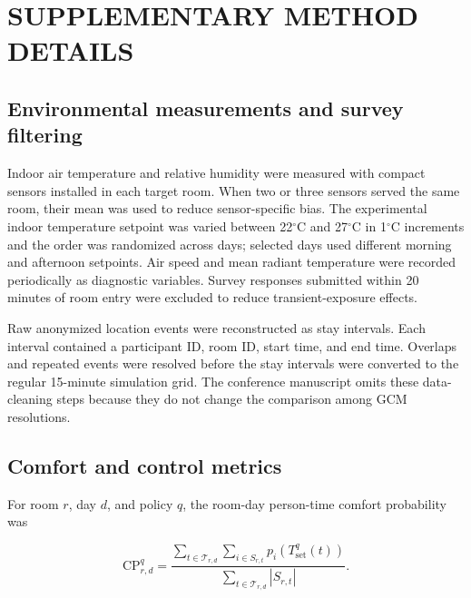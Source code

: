 
\appendix

\section{SUPPLEMENTARY METHOD DETAILS}

\subsection{Environmental measurements and survey filtering}

Indoor air temperature and relative humidity were measured with compact sensors installed in each target room. When two or three sensors served the same room, their mean was used to reduce sensor-specific bias. The experimental indoor temperature setpoint was varied between 22$^\circ$C and 27$^\circ$C in 1$^\circ$C increments and the order was randomized across days; selected days used different morning and afternoon setpoints. Air speed and mean radiant temperature were recorded periodically as diagnostic variables. Survey responses submitted within 20 minutes of room entry were excluded to reduce transient-exposure effects.

Raw anonymized location events were reconstructed as stay intervals. Each interval contained a participant ID, room ID, start time, and end time. Overlaps and repeated events were resolved before the stay intervals were converted to the regular 15-minute simulation grid. The conference manuscript omits these data-cleaning steps because they do not change the comparison among GCM resolutions.

\subsection{Comfort and control metrics}

For room $r$, day $d$, and policy $q$, the room-day person-time comfort probability was

\begin{equation}
 \mathrm{CP}_{r,d}^{q}=
 \frac{\sum_{t\in\mathcal{T}_{r,d}}\sum_{i\in S_{r,t}}
 p_i\!\left(T_{\mathrm{set}}^{q}(t)\right)}
 {\sum_{t\in\mathcal{T}_{r,d}}|S_{r,t}|}.
\end{equation}

